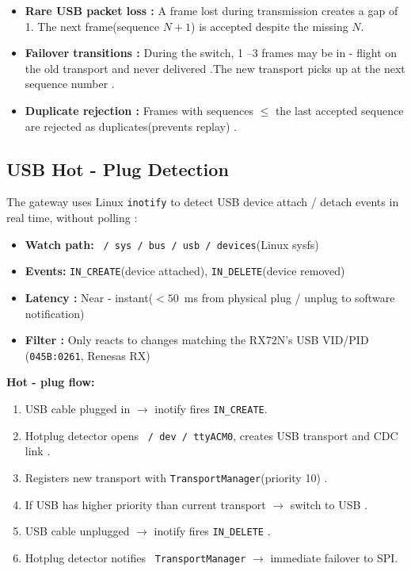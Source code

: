 \begin{itemize}[leftmargin = 1.5em, topsep = 4pt, itemsep = 2pt]
    \item \textbf{Rare USB packet loss :
               } A frame lost during transmission creates a gap of 1. The next
    frame(sequence $N + 1 $) is accepted despite the missing $N$.
    \item \textbf{Failover transitions :} During the switch,
    1 --3 frames may be in - flight on the old transport and never delivered
                                 .The
                             new transport picks up at the next sequence number
                                 .
    \item \textbf{Duplicate rejection :} Frames with sequences $\leq$ the last
                             accepted sequence are rejected as
                             duplicates(prevents replay)
                                 .
\end{itemize}

\subsection{USB Hot - Plug Detection}
\label{subsec : hotplug}

    The gateway uses Linux \texttt{inotify} to detect USB device attach /
    detach events in real time,
    without polling :

\begin{itemize}[leftmargin = 1.5em, topsep = 4pt, itemsep = 2pt]
    \item \textbf{Watch path:
}
\texttt{ / sys / bus / usb / devices}(Linux sysfs)
    \item \textbf{Events:
}
\texttt{IN\_CREATE}(device attached), \texttt{IN\_DELETE}(device removed)
    \item \textbf{Latency :
} Near - instant($ < 50 $\,
                 ms from physical plug / unplug to software notification)
    \item \textbf{Filter :} Only reacts to changes matching the RX72N's USB VID/PID (\texttt{045B:0261}, Renesas RX)
\end{itemize}

\textbf{Hot - plug flow:}
\begin{enumerate}[leftmargin = 1.5em, topsep = 4pt, itemsep = 2pt]
    \item USB cable plugged in $\rightarrow$ inotify fires \texttt{IN\_CREATE}.
    \item Hotplug detector opens \texttt{ / dev / ttyACM0},
    creates USB transport and CDC link
        .
    \item Registers new transport with \texttt{TransportManager}(priority 10)
        .
    \item If USB has higher priority than current transport $\rightarrow$
    switch to USB
        .
    \item USB cable unplugged $\rightarrow$ inotify fires \texttt{IN\_DELETE}
        .
    \item Hotplug detector notifies \texttt{
            TransportManager} $\rightarrow$ immediate failover to SPI.
\end{enumerate}

